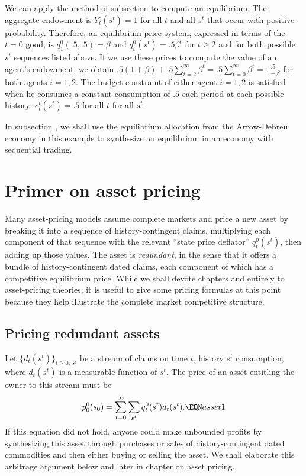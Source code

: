 We can apply the method of subsection  to compute an equilibrium.  The aggregate endowment is $Y_t(s^t)=1$
for all $t$ and all $s^t$ that occur with positive probability.  Therefore, an equilibrium price system, expressed in terms of 
the $t=0$ good, is $q^0_1(.5, .5)= \beta$ and 
$q_t^0 (s^t) = .5 \beta^t$ for $t \geq 2$ and for both 
possible $s^t$ sequences listed above.
If we use these prices to compute the value of an agent's endowment, we obtain $.5 (1 + \beta) +.5 
\sum_{t=2}^\infty \beta^t = .5 \sum_{t=0}^\infty \beta^t 
 = {\frac{.5}{1-\beta}}$ for both agents $i=1,2$.
The budget constraint of either agent $i=1,2$ is 
satisfied when he consumes a constant
consumption of $.5$ each period at  each possible history: $c_t^i(s^t) = .5$ for all $t$ for all $s^t$.

In subsection , we shall use the equilibrium allocation from the Arrow-Debreu economy in this example
to synthesize an equilibrium in an economy with sequential trading.




\section{Primer on asset pricing}
Many asset-pricing models       assume complete markets and price
a new asset by breaking it into a sequence of history-contingent
claims, multiplying each  component of that sequence with the
relevant ``state price deflator'' $q_t^0(s^t)$, then adding up
those values. The  asset is  {\it redundant\/}, in the
sense that it offers a bundle of history-contingent dated claims,
each component of which has a competitive equilibrium price.
While we shall devote chapters  and  entirely  to
asset-pricing theories, it is useful to give some pricing formulas
at this  point because they help illustrate  the complete market
competitive structure.


\subsection{Pricing redundant assets}
  Let $\{d_t(s^t)\}_{t\geq 0,\,s^t}$ be a stream of claims
on time $t$, history $s^t$ consumption, where $d_t(s^t)$ is a measurable
function of $s^t$.  The price of   an asset entitling
the owner to this stream
must be
$$ p^0_0(s_0)  = \sum_{t=0}^\infty  \sum_{s^t} q_t^0(s^t) d_t(s^t) . \EQN asset1
$$
If this equation did not hold, anyone could make unbounded profits
by synthesizing this asset  through
purchases or sales  of  history-contingent dated commodities
and then either buying or selling the asset.
We shall elaborate  this arbitrage argument
below and later in  chapter  on asset pricing.




